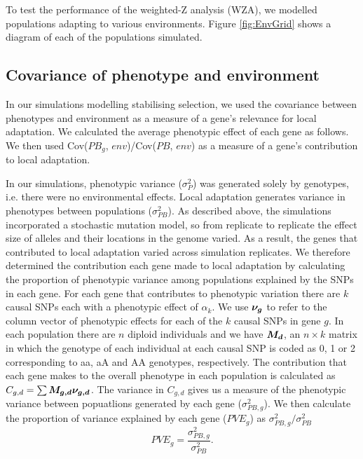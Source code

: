 \documentclass[11pt,twoside,lineno]{GSA_format}
\newcommand{\bm}[1]{\mbox{\boldmath{$#1$}}}
\begin{document}


To test the performance of the weighted-Z analysis (WZA), we modelled populations adapting to various environments. Figure \ref{fig:EnvGrid} shows a diagram of each of the populations simulated.


\subsection{Covariance of phenotype and environment} 

In our simulations modelling stabilising selection, we used the covariance between phenotypes and environment as a measure of a gene's relevance for local adaptation. We calculated the average phenotypic effect of each gene as follows.
We then used Cov($PB_g$, $env$)/Cov($PB$, $env$) as a measure of a gene's contribution to local adaptation.


In our simulations, phenotypic variance ($\sigma^{2}_{P}$) was generated solely by genotypes, i.e. there were no environmental effects. Local adaptation generates variance in phenotypes between populations ($\sigma^{2}_{PB}$). 
As described above, the simulations incorporated a stochastic mutation model, so from replicate to replicate the effect size of alleles and their locations in the genome varied. As a result, the genes that contributed to local adaptation varied across simulation replicates. We therefore determined the contribution  each gene made to local adaptation by calculating the proportion of phenotypic variance among populations explained by the SNPs in each gene. For each gene that contributes to phenotypic variation there are $k$ causal SNPs each with a phenotypic effect of $\alpha_k$. We use $\bm{\nu_g}$ to refer to the column vector of phenotypic effects for each of the $k$ causal SNPs in gene $g$. In each population there are $n$ diploid individuals and we have $\bm{M_d}$, an $n \times k$ matrix in which the genotype of each individual at each causal SNP is coded as 0, 1 or 2 corresponding to aa, aA and AA genotypes, respectively. The contribution that each gene makes to the overall phenotype in each population is calculated as $C_{g,d} = \sum \bm{M_{g,d} \nu_{g,d}}$. The variance in $C_{g,d}$ gives us a measure of the phenotypic variance between popuatlions generated by each gene ($\sigma^{2}_{PB,g}$). We then calculate the proportion of variance explained by each gene ($PVE_g$) as $\sigma^{2}_{PB,g} / \sigma^{2}_{PB}$
\begin{equation}
PVE_g = \frac{\sigma^{2}_{PB,g}}{\sigma^{2}_{PB}}.
\end{equation}
\end{document}

